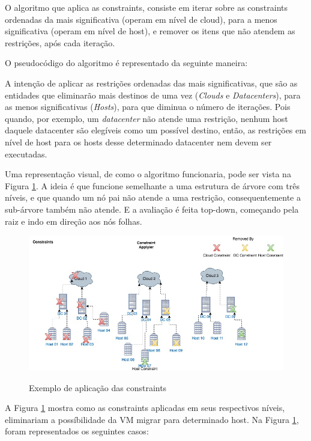 O algoritmo que aplica as constraints, consiste em iterar sobre as constraints ordenadas da mais significativa 
(operam em nível de cloud), para a menos significativa (operam em nível de host), e remover os itens que não atendem as
restrições, após cada iteração.

O pseudocódigo do algoritmo é representado da seguinte maneira:



A intenção de aplicar as restrições ordenadas das mais significativas, que são as 
entidades que eliminarão mais destinos de uma vez (\textit{Clouds} e \textit{Datacenters}),
para as menos significativas (\textit{Hosts}), para que diminua o número de iterações.
Pois quando, por exemplo, um \textit{datacenter} não atende uma restrição, nenhum host daquele datacenter 
são elegíveis como um possível destino, então, as restrições em nível de host para
os hosts desse determinado datacenter nem devem ser executadas. 

Uma representação visual, de como o algoritmo funcionaria, pode ser vista na Figura \ref{fig:constraintapplyier}. 
A ideia é que funcione semelhante a uma estrutura de árvore com três níveis, e que quando um nó pai não atende 
a uma restrição, consequentemente a sub-árvore também não atende. E a avaliação é feita top-down, começando pela
raiz e indo em direção aos nós folhas.

\begin{figure}[!htb]
  \centering
  \caption{Exemplo de aplicação das constraints}
  \includegraphics[width=1\textwidth]{./dados/figuras/constraintapplyier}
  \label{fig:constraintapplyier}
\end{figure}

A Figura \ref{fig:constraintapplyier} mostra como as constraints aplicadas em seus respectivos níveis, eliminariam a possíbilidade
da VM migrar para determinado host. Na Figura \ref{fig:constraintapplyier}, foram representados os seguintes casos:

